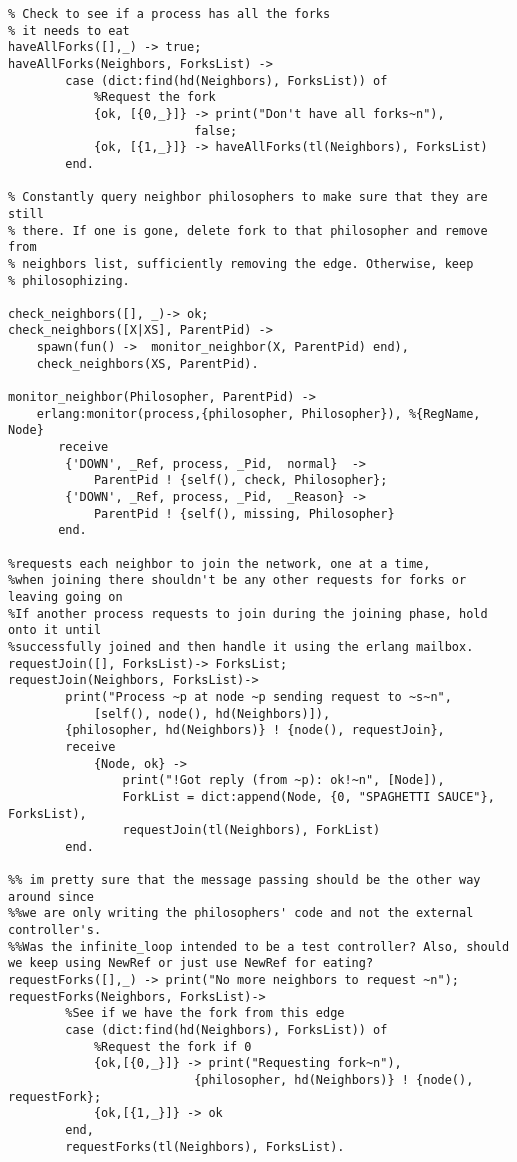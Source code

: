 \documentclass[11pt]{article}
\begin{document}
\begin{lstlisting}
% Check to see if a process has all the forks
% it needs to eat
haveAllForks([],_) -> true;
haveAllForks(Neighbors, ForksList) ->
        case (dict:find(hd(Neighbors), ForksList)) of
            %Request the fork
            {ok, [{0,_}]} -> print("Don't have all forks~n"),
                          false;
            {ok, [{1,_}]} -> haveAllForks(tl(Neighbors), ForksList)
        end.

% Constantly query neighbor philosophers to make sure that they are still
% there. If one is gone, delete fork to that philosopher and remove from 
% neighbors list, sufficiently removing the edge. Otherwise, keep
% philosophizing. 

check_neighbors([], _)-> ok;
check_neighbors([X|XS], ParentPid) ->
    spawn(fun() ->  monitor_neighbor(X, ParentPid) end),
    check_neighbors(XS, ParentPid).

monitor_neighbor(Philosopher, ParentPid) ->
    erlang:monitor(process,{philosopher, Philosopher}), %{RegName, Node}
       receive
        {'DOWN', _Ref, process, _Pid,  normal}  ->
            ParentPid ! {self(), check, Philosopher};
        {'DOWN', _Ref, process, _Pid,  _Reason} ->
            ParentPid ! {self(), missing, Philosopher}
       end.

%requests each neighbor to join the network, one at a time,
%when joining there shouldn't be any other requests for forks or leaving going on
%If another process requests to join during the joining phase, hold onto it until
%successfully joined and then handle it using the erlang mailbox.
requestJoin([], ForksList)-> ForksList;
requestJoin(Neighbors, ForksList)->
        print("Process ~p at node ~p sending request to ~s~n", 
            [self(), node(), hd(Neighbors)]),
        {philosopher, hd(Neighbors)} ! {node(), requestJoin},
        receive
            {Node, ok} -> 
                print("!Got reply (from ~p): ok!~n", [Node]),
                ForkList = dict:append(Node, {0, "SPAGHETTI SAUCE"}, ForksList),
                requestJoin(tl(Neighbors), ForkList)
        end.

%% im pretty sure that the message passing should be the other way around since 
%%we are only writing the philosophers' code and not the external controller's. 
%%Was the infinite_loop intended to be a test controller? Also, should we keep using NewRef or just use NewRef for eating?
requestForks([],_) -> print("No more neighbors to request ~n");
requestForks(Neighbors, ForksList)->
        %See if we have the fork from this edge
        case (dict:find(hd(Neighbors), ForksList)) of
            %Request the fork if 0
            {ok,[{0,_}]} -> print("Requesting fork~n"),
                          {philosopher, hd(Neighbors)} ! {node(), requestFork};
            {ok,[{1,_}]} -> ok
        end,
        requestForks(tl(Neighbors), ForksList).


\end{lstlisting}
\end{document}
